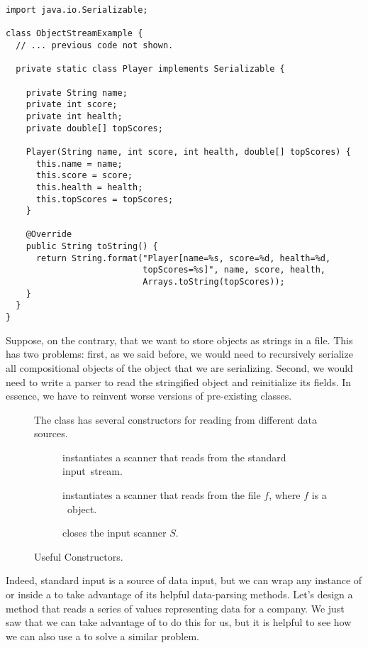 \begin{lstlisting}[language=MyJava]
import java.io.Serializable;

class ObjectStreamExample {
  // ... previous code not shown.

  private static class Player implements Serializable {

    private String name;
    private int score;
    private int health;
    private double[] topScores;
    
    Player(String name, int score, int health, double[] topScores) {
      this.name = name;
      this.score = score;
      this.health = health;
      this.topScores = topScores;
    }
    
    @Override
    public String toString() {
      return String.format("Player[name=%s, score=%d, health=%d, 
                           topScores=%s]", name, score, health, 
                           Arrays.toString(topScores));
    }
  }
}
\end{lstlisting}

Suppose, on the contrary, that we want to store objects as strings in a file. 
This has two problems: first, as we said before, we would need to recursively serialize all compositional objects of the object that we are serializing. 
Second, we would need to write a parser to read the stringified object and reinitialize its fields. 
In essence, we have to reinvent worse versions of pre-existing classes.

\begin{figure}[tp]
  \small
  \begin{tcolorbox}[title=Scanner Constructor Methods]
    The  class has several constructors for reading from different data sources.
    \vspace{2ex}
  \begin{description}
    \item [] instantiates a scanner that reads from the standard input~stream.
    \item [] instantiates a scanner that reads from the file $f$, where $f$ is a ~object.
    \item [] closes the input scanner $S$.
  \end{description}
\end{tcolorbox}
\caption{Useful  Constructors.}
\label{fig:sccons}
\end{figure}

Indeed, standard input is a source of data input, but we can wrap any instance of  or  inside a  to take advantage of its helpful data-parsing methods. 
Let's design a method that reads a series of values representing  data for a company. 
We just saw that we can take advantage of  to do this for us, but it is helpful to see how we can also use a  to solve a similar problem.


